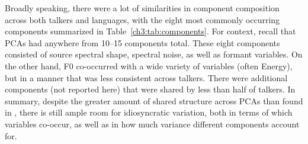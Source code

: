 Broadly speaking, there were a lot of similarities in component composition across both talkers and languages, with the eight most commonly occurring components summarized in Table~\ref{ch3:tab:components}. For context, recall that PCAs had anywhere from 10--15 components total. These eight components consisted of source spectral shape, spectral noise, as well as formant variables. On the other hand, F0 co-occurred with a wide variety of variables (often Energy), but in a manner that was less consistent across talkers. There were additional components (not reported here) that were shared by less than half of talkers. In summary, despite the greater amount of shared structure across PCAs than found in \citet{lee_2019_acoustic}, there is still ample room for idiosyncratic variation, both in terms of which variables co-occur, as well as in how much variance different components account for. 

